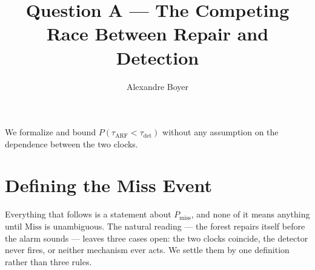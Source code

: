 \documentclass[11pt,a4paper]{article}
\title{Question A --- The Competing Race Between Repair and Detection}
\author{Alexandre Boyer}
\date{}
\begin{document}
\maketitle

\noindent We formalize and bound $P(\tau_{\mathrm{ARF}} < \tau_{\mathrm{det}})$ without
any assumption on the dependence between the two clocks.

\begin{center}
\end{center}

\section{Defining the Miss Event}

Everything that follows is a statement about $P_{\mathrm{miss}}$, and none of it means
anything until $\mathrm{Miss}$ is unambiguous. The natural reading --- the forest repairs
itself before the alarm sounds --- leaves three cases open: the two clocks coincide, the
detector never fires, or neither mechanism ever acts. We settle them by one definition
rather than three rules.
\end{document}
